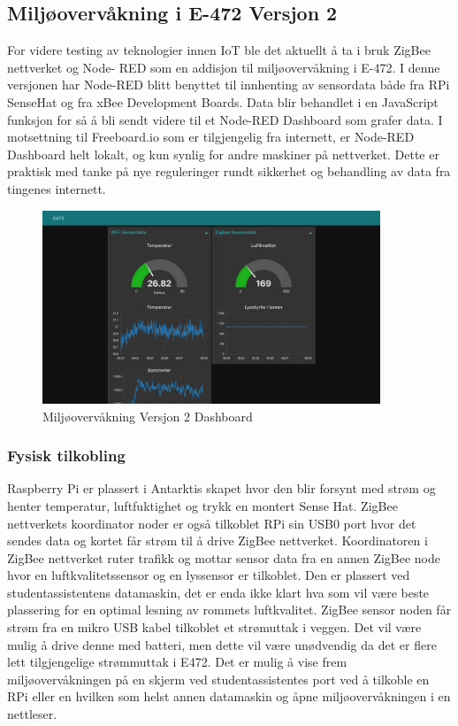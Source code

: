 \documentclass{article}
\begin{document}
\subsection{Miljøovervåkning i E-472 Versjon 2}
For videre testing av teknologier innen IoT ble det aktuellt å ta i bruk ZigBee nettverket og Node- RED som en addisjon til miljøovervåkning i E-472. I denne versjonen har Node-RED blitt benyttet til innhenting av sensordata både fra RPi SenseHat og fra xBee Development Boards. Data blir behandlet i en JavaScript funksjon for så å bli sendt videre til et Node-RED Dashboard som grafer data. I motsettning til Freeboard.io som er tilgjengelig fra internett, er Node-RED Dashboard helt lokalt, og kun synlig for andre maskiner på nettverket. Dette er praktisk med tanke på nye reguleringer rundt sikkerhet og behandling av data fra tingenes internett. 

\begin{figure}[!ht]
  \centering
      \includegraphics[width=0.9\textwidth]{iotdash}
  \caption{Miljøovervåkning Versjon 2 Dashboard}
\end{figure}

\subsubsection{Fysisk tilkobling}

Raspberry Pi er plassert i Antarktis skapet hvor den blir forsynt med strøm og henter temperatur, luftfuktighet og trykk en montert Sense Hat. ZigBee nettverkets koordinator noder er også tilkoblet RPi sin USB0 port hvor det sendes data og kortet får strøm til å drive ZigBee nettverket. Koordinatoren i ZigBee nettverket ruter trafikk og mottar sensor data fra en annen ZigBee node hvor en luftkvalitetssensor og en lyssensor er tilkoblet. Den er plassert ved studentassistentens datamaskin, det er enda ikke klart hva som vil være beste plassering for en optimal lesning av rommets luftkvalitet. ZigBee sensor noden får strøm fra en mikro USB kabel tilkoblet et strømuttak i veggen. Det vil være mulig å drive denne med batteri, men dette vil være unødvendig da det er flere lett tilgjengelige strømmuttak i E472. Det er mulig å vise frem miljøovervåkningen på en skjerm ved studentassistentes port ved å tilkoble en RPi eller en hvilken som helst annen datamaskin og åpne miljøovervåkningen i en nettleser.
\end{document}
